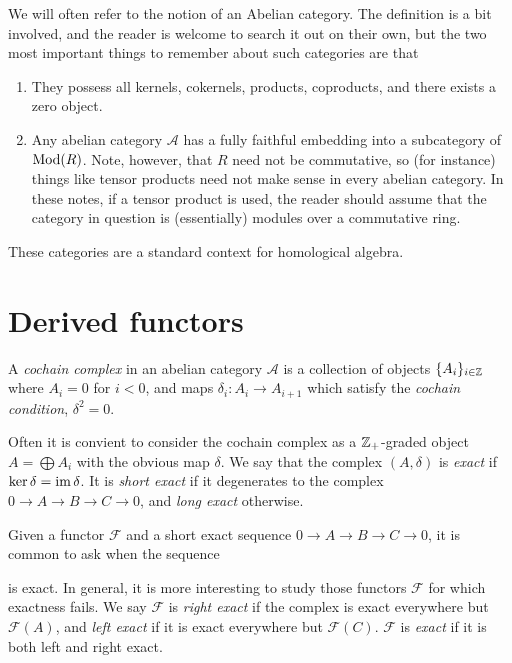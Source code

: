 We will often refer to the notion of an Abelian category. The definition is a
bit involved, and the reader is welcome to search it out on their own, but the
two most important things to remember about such categories are that
\begin{enumerate}
    \item They possess all kernels, cokernels, products, coproducts, and there
        exists a zero object.

    \item Any abelian category $\mathcal{A}$ has a fully faithful embedding into
        a subcategory of $\operatorname{Mod}(R)$. Note, however, that $R$ need not be
        commutative, so (for instance) things like tensor products need not make
        sense in every abelian category. In these notes, if a tensor product is
        used, the reader should assume that the category in question is
        (essentially) modules over a commutative ring. 
\end{enumerate}
These categories are a standard context for homological algebra.

\section{Derived functors}

\begin{definition}
    A \textit{cochain complex} in an abelian category $\mathcal{A}$ is a
    collection of objects $\{A_i\}_{i \in \mathbb{Z}}$ where $A_i = 0$ for $i < 0$, and
    maps $\delta_i : A_i \to A_{i+1}$ which satisfy the \textit{cochain
        condition}, $\delta^2 = 0$.
\end{definition}

Often it is convient to consider the cochain complex as a $\mathbb{Z}_+$-graded object
$A = \bigoplus A_i$ with the obvious map $\delta$. We say that the complex $(A,
\delta)$ is \textit{exact} if $\ker{\delta}=\operatorname{im}{\delta}$. It is \textit{short
    exact} if it degenerates to the complex $0 \to A \to B \to C \to 0$, and
\textit{long exact} otherwise.

Given a functor $\mathcal{F}$ and a short exact sequence $0 \to A \to B \to C
\to 0$, it is common to ask when the sequence
\begin{center}
\end{center}
is exact. In general, it is more interesting to study those functors
$\mathcal{F}$ for which exactness fails. We say $\mathcal{F}$ is \textit{right
    exact} if the complex is exact everywhere but $\mathcal{F}(A)$, and
\textit{left exact} if it is exact everywhere but $\mathcal{F}(C)$.
$\mathcal{F}$ is \textit{exact} if it is both left and right exact.

